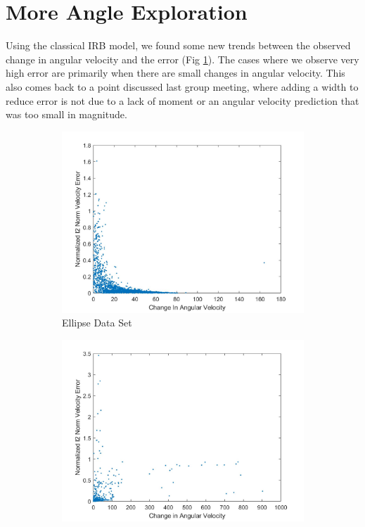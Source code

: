 \documentclass{article}
\begin{document}
\section{More Angle Exploration}
Using the classical IRB model, we found some new trends between the observed change in angular velocity and the error (Fig \ref{fig:changeInOmegaEllipse}). The cases where we observe very high error are primarily when there are small changes in angular velocity. This also comes back to a point discussed last group meeting, where adding a width to reduce error is not due to a lack of moment or an angular velocity prediction that was too small in magnitude. 
\begin{figure}[h!]
    \centering
    
     \begin{subfigure}[b]{0.45\linewidth}
            \centering
            \includegraphics[scale=0.12]{changeInOmegaEllipse.jpg}
            \caption{Ellipse Data Set}
            \label{fig:changeInOmegaEllipse}
    \end{subfigure}
    \quad
    \begin{subfigure}[b]{0.45\linewidth}
            \centering
            \includegraphics[scale=0.12]{changeInOmegaSquare.jpg}

\end{subfigure}
\end{figure}
\end{document}
